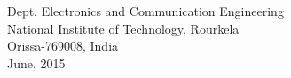 \begin{titlepage}
\begin{center}
\large Dept. Electronics and Communication Engineering\\
National Institute of Technology, Rourkela\\Orissa-769008, India\\
\vspace{0.1in}
June, 2015
\end{center}
\end{titlepage}
